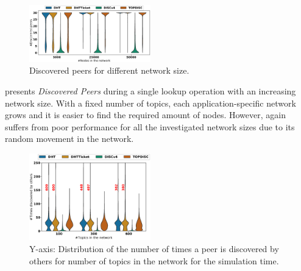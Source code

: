 
\begin{figure}[!h]
\includegraphics[width=0.470\textwidth]{results/no_split/violin_size_discovered.eps}
\caption{Discovered peers for different network size.}
\label{fig:discoveredPerSize}
\end{figure}

 presents \emph{Discovered Peers} during a single lookup operation with an increasing network size. With a fixed number of topics, each application-specific network grows and it is easier to find the required amount of nodes. However, \discv again suffers from poor performance for all the investigated network sizes due to its random movement in the network. 

\iffalse %
\begin{figure}
\includegraphics[width=0.470\textwidth]{results/no_split/violin_topic_wasDiscovered.eps}
\caption{Y-axis: Distribution of the number of times a peer is discovered by others for number of topics in the network for the simulation time.}
\label{fig:discoveredByPerTopic}
\end{figure}

